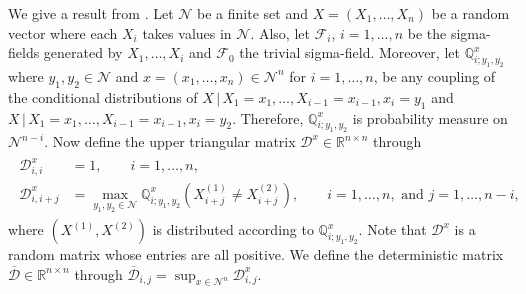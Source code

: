 \documentclass{article}
\begin{document}
We give a result from \cite{chazottes2007concentration}. Let $\mathcal{N}$ be a finite set and $X=(X_1,\ldots,X_n)$ be a random vector where each $X_i$ takes values in $\mathcal{N}$. Also, let $\mathscr{F}_{i}$, $i=1, \ldots, n$ be the sigma-fields generated by $X_1,\ldots, X_i$ and $\mathscr{F}_0$ the trivial sigma-field. Moreover, let $\mathbb{Q}_{i;y_1,y_2}^x$ where $y_1,y_2 \in \mathcal{N}$ and $x = (x_1, \ldots , x_n) \in \mathcal{N}^n $ for $i=1,\ldots,n$, be any coupling of the conditional distributions of $ X \, \vert \, X_1=x_1, \ldots, X_{i-1}=x_{i-1},x_i = y_1$ and $X \, \vert \, X_1=x_1, \ldots, X_{i-1}=x_{i-1},x_i = y_2$. Therefore, $\mathbb{Q}_{i;y_1,y_2}^x$ is probability measure on $\mathcal{N}^{n-i}$. Now define the upper triangular matrix $\mathcal{D}^x \in \mathbb{R}^{n \times n} $ through 
\begin{align} \label{coupling_matrix}
    \begin{split}
    \mathcal{D}_{i,i}^x& = 1 , \qquad  i= 1, \ldots,n, \\
    \mathcal{D}_{i,i+j}^x &= \max_{y_1,y_2 \in \mathcal{N}} \mathbb{Q}_{i;y_1,y_2}^x(X_{i+j}^{(1)} \neq X_{i+j}^{(2)} ), \qquad i= 1, \ldots,n, \text{ and } j=1,\ldots,n-i,
    \end{split}
\end{align}
where $(X^{(1)}, X^{(2)} )$ is distributed according to $\mathbb{Q}_{i;y_1,y_2}^x$. Note that $\mathcal{D}^x$ is a random matrix whose entries are all positive. We define the deterministic matrix $\overline{\mathcal{D}} \in \mathbb{R}^{n \times n}$ through $\overline{\mathcal{D}}_{i,j}= \sup_{x \in \mathcal{N}^n} \mathcal{D}_{i,j}^x $.
\end{document}
